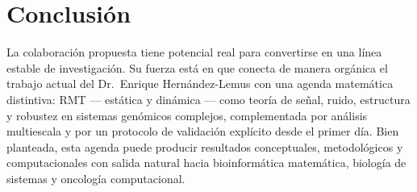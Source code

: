 \documentclass[11pt]{article}
\begin{document}
\section*{Conclusión}
La colaboración propuesta tiene potencial real para convertirse en una línea estable de investigación. Su fuerza está en que conecta de manera orgánica el trabajo actual del Dr.\ Enrique Hernández-Lemus con una agenda matemática distintiva: RMT --- estática y dinámica --- como teoría de señal, ruido, estructura y robustez en sistemas genómicos complejos, complementada por análisis multiescala y por un protocolo de validación explícito desde el primer día. Bien planteada, esta agenda puede producir resultados conceptuales, metodológicos y computacionales con salida natural hacia bioinformática matemática, biología de sistemas y oncología computacional.
\end{document}
